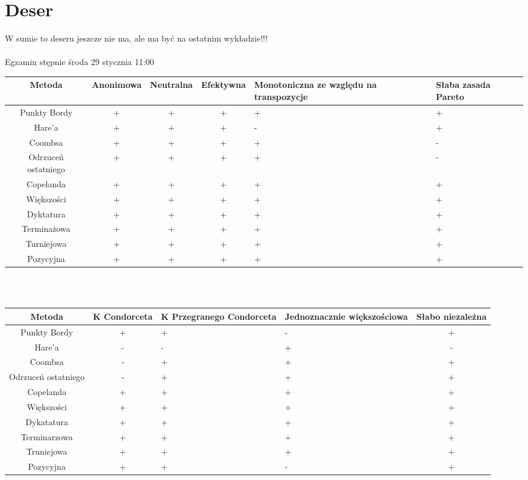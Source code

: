 \documentclass[12pt,a4paper]{article}
\theoremstyle{break}
\begin{document}
		
	\newpage
	\section{Deser}
	W sumie to deseru jeszcze nie ma, ale ma być na ostatnim wykładzie!!! \\\\
	Egzamin stępnie środa 29 stycznia 11:00
	
	\begin{tabular}{|c|c|c|c|p{2.5cm}|p{1cm}|}\hline
		Metoda & Anonimowa & Neutralna & Efektywna & Monotoniczna ze względu na transpozycje&Słaba zasada Pareto\\\hline
		Punkty Bordy   &+&+&+&+&+\\\hline
		Hare'a   &+&+&+&-&+\\\hline
		Coombsa &+&+&+&+&-\\\hline
		Odrzuceń ostatniego &+&+&+&+&-\\\hline
		Copelanda &+&+&+&+&+\\\hline
		Większości &+&+&+&+&+\\\hline
		Dyktatura &+&+&+&+&+\\\hline
		Terminażowa &+&+&+&+&+\\\hline
		Turniejowa &+&+&+&+&+\\\hline
		Pozycyjna &+&+&+&+&+\\\hline
	\end{tabular}\\\\
	
	\begin{tabular}{|c|c|p{3cm}|p{3cm}|c|}\hline
		Metoda &K Condorceta& K Przegranego Condorceta&Jednoznacznie większościowa&Słabo niezależna\\\hline
		Punkty Bordy   &+&+&-&+\\\hline
		Hare'a   &-&-&+&-\\\hline
		Coombsa &-&+&+&+\\\hline
		Odrzuceń ostatniego &-&+&+&+\\\hline
		Copelanda &+&+&+&+\\\hline
		Większości &+&+&+&+\\\hline
		Dykatatura &+&+&+&+\\\hline
		Terminarzowa &+&+&+&+\\\hline
		Truniejowa &+&+&+&+\\\hline
		Pozycyjna &+&+&-&+\\\hline
	\end{tabular}\\
	
	
		
	\begin{center}
		 {\fontsize{30}{36}\selectfont\faBirthdayCake}
	\end{center}
	

	
	
\end{document}
